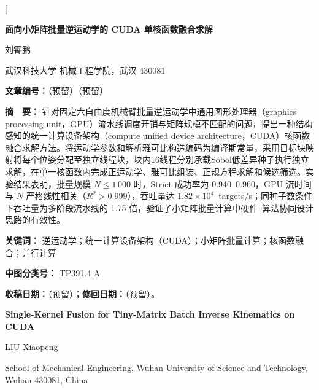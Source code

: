 \documentclass[twocolumn,a4paper,10pt]{ctexart}
\begin{document}
\twocolumn[%
{\centering
{\LARGE\bfseries 面向小矩阵批量逆运动学的 CUDA 单核函数融合求解}\par\vspace{4mm}
{\large 刘霄鹏}\par\vspace{1mm}
{\small 武汉科技大学 机械工程学院，武汉 430081}\par\vspace{3mm}
{\small\bfseries 文章编号：}（预留）（预留）\par\vspace{2mm}
\begin{minipage}{0.91\textwidth}\small
{\bfseries 摘　要：} 针对固定六自由度机械臂批量逆运动学中通用图形处理器（graphics processing unit，GPU）流水线调度开销与矩阵规模不匹配的问题，提出一种结构感知的统一计算设备架构（compute unified device architecture，CUDA）核函数融合求解方法。将运动学参数和解析雅可比构造编码为编译期常量，采用目标块映射将每个位姿分配至独立线程块，块内16线程分别承载Sobol低差异种子执行独立求解，在单一核函数内完成正运动学、雅可比组装、正规方程求解和候选筛选。实验结果表明，批量规模 $N\le1\,000$ 时，Strict 成功率为 0.940~0.960，GPU 流时间与 $N$ 严格线性相关（$R^2>0.999$），吞吐量达 $1.82\times10^4$~targets/s；同种子数条件下吞吐量为多阶段流水线的 1.75 倍，验证了小矩阵批量计算中硬件--算法协同设计思路的有效性。
\par\vspace{2mm}
{\bfseries 关键词：} 逆运动学；统一计算设备架构（CUDA）；小矩阵批量计算；核函数融合；并行计算\par
{\bfseries 中图分类号：} TP391.4 A\par
{\bfseries 收稿日期：}（预留）；{\bfseries 修回日期：}（预留）。\par
\end{minipage}\par\vspace{4mm}
\begin{minipage}{0.91\textwidth}\small
{\centering
{\bfseries\large Single-Kernel Fusion for Tiny-Matrix Batch Inverse Kinematics on CUDA}\par\vspace{2mm}
{\small LIU Xiaopeng}\par\vspace{1mm}
{\small School of Mechanical Engineering, Wuhan University of Science and Technology, Wuhan 430081, China}\par\vspace{3mm}
}

\end{minipage}}
\end{document}
